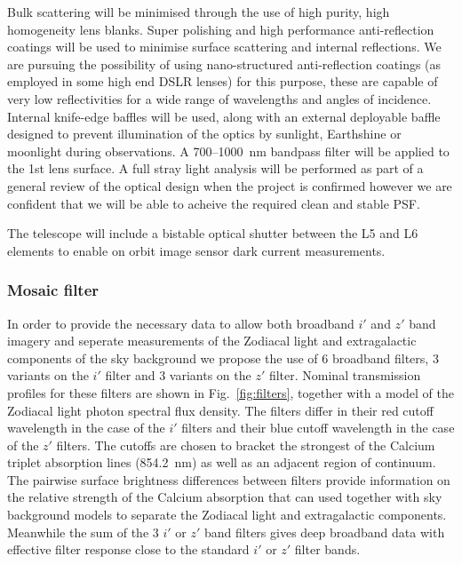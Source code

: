 \documentclass[]{iac}
\begin{document}
Bulk scattering will be minimised through the use of high purity, high homogeneity lens blanks. Super polishing and high
performance anti-reflection coatings will be used to minimise surface scattering and internal reflections. We are
pursuing the possibility of using nano-structured anti-reflection coatings (as employed in some high end DSLR lenses)
for this purpose, these are capable of very low reflectivities for a wide range of wavelengths and angles of incidence.
Internal knife-edge baffles will be used, along with an external deployable baffle designed to prevent illumination of
the optics by sunlight, Earthshine or moonlight during observations. A 700--\SI{1000}{\nano\metre} bandpass filter will
be applied to the 1st lens surface. A full stray light analysis will be performed as part of a general review of the
optical design when the project is confirmed however we are confident that we will be able to acheive the required clean
and stable PSF.

The telescope will include a bistable optical shutter between the L5 and L6 elements to enable on orbit image sensor
dark current measurements.

\subsubsection{Mosaic filter}
\label{sec:mosaic}

In order to provide the necessary data to allow both broadband $i'$ and $z'$ band imagery and seperate measurements of
the Zodiacal light and extragalactic components of the sky background we propose the use of 6 broadband filters, 3
variants on the $i'$ filter and 3 variants on the $z'$ filter. Nominal transmission profiles for these filters are shown
in Fig.~\ref{fig:filters}, together with a model of the Zodiacal light photon spectral flux density. The filters differ
in their red cutoff wavelength in the case of the $i'$ filters and their blue cutoff wavelength in the case of the $z'$
filters. The cutoffs are chosen to bracket the strongest of the Calcium triplet absorption lines
(\SI{854.2}{\nano\metre}) as well as an adjacent region of continuum. The pairwise surface brightness differences
between filters provide information on the relative strength of the Calcium absorption that can used together with sky
background models to separate the Zodiacal light and extragalactic components. Meanwhile the sum of the 3 $i'$ or $z'$
band filters gives deep broadband data with effective filter response close to the standard $i'$ or $z'$ filter bands.
\end{document}
